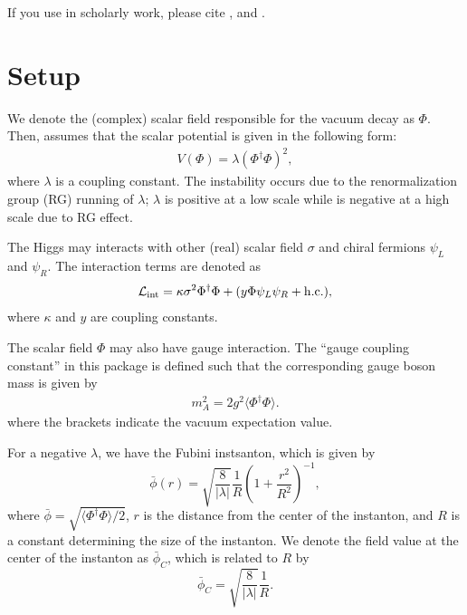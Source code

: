 \documentclass[12pt]{article}
\begin{document}
If you use \codename in scholarly work, please cite
\cite{Chigusa:2017dux}, \cite{Chigusa:2018uuj} and \cite{Baratella:2024hju}.

\section{Setup}

We denote the (complex) scalar field responsible for the vacuum decay
as $\Phi$.  Then, \codename assumes that the scalar potential is given
in the following form:
\begin{align}
  V(\Phi) = \lambda(\Phi^\dagger\Phi)^2,
  \label{pot}
\end{align}
where $\lambda$ is a coupling constant.  The instability occurs due to
the renormalization group (RG) running of $\lambda$; $\lambda$ is
positive at a low scale while is negative at a high scale due to RG
effect.

The Higgs may interacts with other (real) scalar field $\sigma$ and
chiral fermions $\psi_L$ and $\psi_R$.  The interaction terms are
denoted as
\begin{align}
  {\cal L}_{\rm int} = \kappa \sigma^2 \Phi^\dagger\Phi
  + (y \Phi \psi_L \psi_R + {\rm h.c.}),
\end{align}
where $\kappa$ and $y$ are coupling constants.  

The scalar field $\Phi$ may also have gauge interaction.  The ``gauge
coupling constant'' in this package is defined such that the
corresponding gauge boson mass is given by
\begin{align}
  m_A^2=2g^2\langle\Phi^\dagger\Phi\rangle.
\end{align}
where the brackets indicate the vacuum expectation value.

For a negative $\lambda$, we have the Fubini instsanton, which is given by
\begin{equation}
 \bar\phi(r) =
 \sqrt{\frac{8}{|\lambda|}}\frac{1}{R}
 \left(
  1+\frac{r^2}{R^2}
 \right)^{-1},
\end{equation}
where $\bar\phi = \sqrt{\langle\Phi^\dagger\Phi\rangle / 2}$, $r$ is the
distance from the center of the instanton, and $R$ is a constant
determining the size of the instanton. We denote the field value at the
center of the instanton as $\bar\phi_C$, which is related to $R$ by
\begin{equation}
 \bar\phi_C=\sqrt{\frac{8}{|\lambda|}}\frac{1}{R}.
\end{equation}
\end{document}
